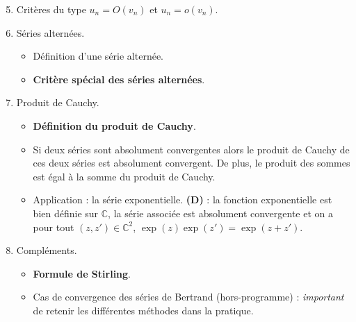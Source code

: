 \documentclass[twoside,a4paper,french,10pt]{VcCours}
\begin{document}
\begin{enumerate}
\setcounter{enumi}{4}
\item Critères du type $u_n = O(v_n)$ et $u_n= o(v_n)$.
\item Séries alternées.
\begin{itemize}
\item Définition d'une série alternée.
\item \textbf{Critère spécial des séries alternées}.
\end{itemize}
\item Produit de Cauchy.
\begin{itemize}
\item \textbf{Définition du produit de Cauchy}.
\item Si deux séries sont absolument convergentes alors le produit de Cauchy de ces deux séries est absolument convergent. De plus, le produit des sommes est égal à la somme du produit de Cauchy.
\item Application : la série exponentielle. \textbf{(D)} : la fonction exponentielle est bien définie sur $\mathbb{C}$, la série associée est absolument convergente et on a pour tout $(z,z') \in \mathbb{C}^2$, $\exp(z)\exp(z')= \exp(z+z')$.
\end{itemize}
\item Compléments.
\begin{itemize}
\item \textbf{Formule de Stirling}.
\item Cas de convergence des séries de Bertrand (hors-programme) : \textit{important} de retenir les différentes méthodes dans la pratique.
\end{itemize}
\end{enumerate}
\end{document}
